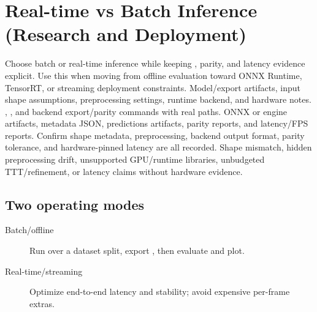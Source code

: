 \chapter{Real-time vs Batch Inference (Research and Deployment)}


\WorkflowOpening
{Choose batch or real-time inference while keeping , parity, and latency evidence explicit.}
{Use this when moving from offline evaluation toward ONNX Runtime, TensorRT, or streaming deployment constraints.}
{Model/export artifacts, input shape assumptions, preprocessing settings, runtime backend, and hardware notes.}
{, , and backend export/parity commands with real paths.}
{ONNX or engine artifacts, metadata JSON, predictions artifacts, parity reports, and latency/FPS reports.}
{Confirm shape metadata, preprocessing, backend output format, parity tolerance, and hardware-pinned latency are all recorded.}
{Shape mismatch, hidden preprocessing drift, unsupported GPU/runtime libraries, unbudgeted TTT/refinement, or latency claims without hardware evidence.}

\section{Two operating modes}
\begin{description}
  \item[Batch/offline] Run over a dataset split, export , then evaluate and plot.
  \item[Real-time/streaming] Optimize end-to-end latency and stability; avoid expensive per-frame extras.
\end{description}

